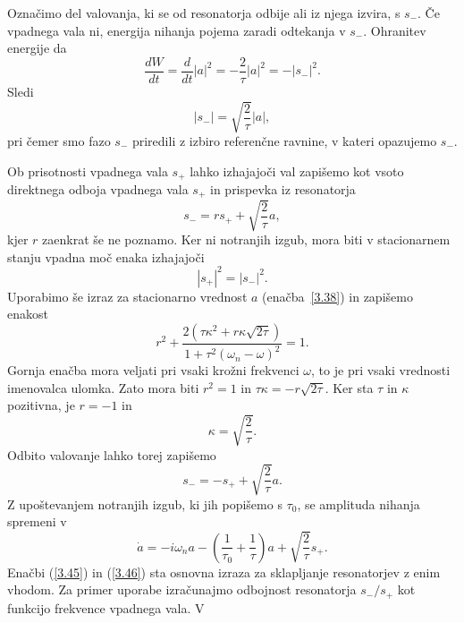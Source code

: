 Označimo del valovanja, ki se od resonatorja odbije ali iz njega izvira, s $s_{-}$.
Če vpadnega vala ni, energija nihanja pojema zaradi odtekanja v $s_{-}$.
Ohranitev energije da 
\begin{equation}
\frac{dW}{dt}=\frac{d}{dt}|a|^{2}=-\frac{2}{\tau}|a|^{2}=-|s_{-}|^{2}.
\label{3.39}
\end{equation}
Sledi
\begin{equation}
|s_{-}|=\sqrt{\frac{2}{\tau}}|a|,
\label{3.40}
\end{equation}
pri čemer smo fazo $s_{-}$ priredili z izbiro referenčne ravnine, v kateri
opazujemo $s_{-}$.

Ob prisotnosti vpadnega vala $s_{+}$ lahko izhajajoči val zapišemo kot
vsoto direktnega odboja vpadnega vala $s_{+}$ in prispevka iz resonatorja
\begin{equation}
s_{-}=rs_{+}+\sqrt{\frac{2}{\tau}}a,
\label{3.41}
\end{equation}
kjer $r$ zaenkrat še ne poznamo. Ker ni notranjih izgub, mora biti v 
stacionarnem stanju vpadna moč enaka izhajajoči
\begin{equation}
|s_{+}|^{2}=|s_{-}|^{2}.
\label{3.42}
\end{equation}
Uporabimo še izraz za stacionarno vrednost $a$  (enačba~\ref{3.38}) in zapišemo
enakost 
\begin{equation}
r^{2}+\frac{2(\tau\kappa^{2}+r\kappa\sqrt{2\tau})}{1+\tau^{2}(\omega_{n}-\omega)^{2}}=1.
\label{3.43}
\end{equation}
Gornja enačba mora veljati pri vsaki krožni  frekvenci $\omega$, to je pri vsaki vrednosti imenovalca
ulomka. Zato mora biti $r^{2}=1$ in $\tau\kappa=-r\sqrt{2\tau}$.
Ker sta $\tau$ in $\kappa$ pozitivna, je $r=-1$ in 
\begin{equation}
\kappa=\sqrt{\frac{2}{\tau}}.
\label{3.44}
\end{equation}
 Odbito valovanje lahko torej zapišemo 
\begin{equation}
s_{-}=-s_{+}+\sqrt{\frac{2}{\tau}}a.
\label{3.45}
\end{equation}
Z upoštevanjem notranjih izgub, ki jih popišemo s $\tau_0$, se amplituda nihanja spremeni v 
\begin{equation}
\dot{a}=-i\omega_{n}a-\left(\frac{1}{\tau_{0}}+\frac{1}{\tau}\right)a+
\sqrt{\frac{2}{\tau}}s_{+}.
\label{3.46}
\end{equation}
 Enačbi (\ref{3.45}) in (\ref{3.46}) sta osnovna izraza za sklapljanje
resonatorjev z enim vhodom. Za primer uporabe izračunajmo odbojnost
resonatorja $s_{-}/s_{+}$ kot funkcijo frekvence vpadnega vala. V
